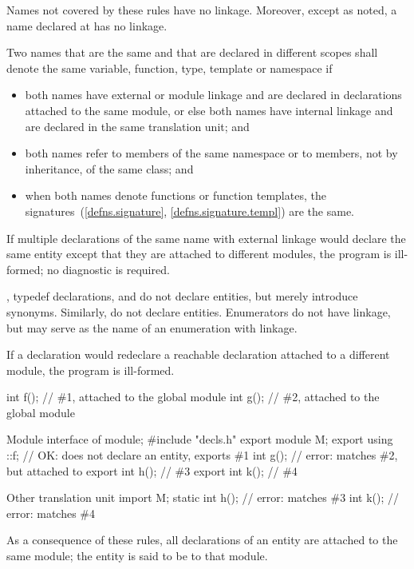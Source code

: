 \pnum
{}%
Names not covered by these rules have no linkage. Moreover, except as
noted, a name declared at  has no
linkage.

\pnum
Two names that are the same and that are declared
in different scopes shall denote the same variable, function,
type, template or namespace if
\begin{itemize}
\item both names have external or module linkage
and are declared in declarations attached to the same module,
or else both names have internal linkage
and are declared in the same translation unit; and

\item both names refer to members of the same namespace or to members,
not by inheritance, of the same class; and

\item when both names denote functions or function templates,
the signatures~(\ref{defns.signature}, \ref{defns.signature.templ})
are the same.

\end{itemize}
If multiple declarations of the same name with external linkage
would declare the same entity except that
they are attached to different modules,
the program is ill-formed; no diagnostic is required.
\begin{note}
,
typedef declarations,
and 
do not declare entities, but merely introduce synonyms.
Similarly,
do not declare entities.
Enumerators do not have linkage,
but may serve as the name of an enumeration with linkage.
\end{note}

\pnum
If a declaration would redeclare a reachable declaration
attached to a different module, the program is ill-formed.
\begin{example}
\begin{codeblocktu}{}
int f();            // \#1, attached to the global module
int g();            // \#2, attached to the global module
\end{codeblocktu}

\begin{codeblocktu}{Module interface of }
module;
#include "decls.h"
export module M;
export using ::f;   // OK: does not declare an entity, exports \#1
int g();            // error: matches \#2, but attached to 
export int h();     // \#3
export int k();     // \#4
\end{codeblocktu}

\begin{codeblocktu}{Other translation unit}
import M;
static int h();     // error: matches \#3
int k();            // error: matches \#4
\end{codeblocktu}
\end{example}
As a consequence of these rules,
all declarations of an entity are attached to the same module;
the entity is said to be  to that module.

